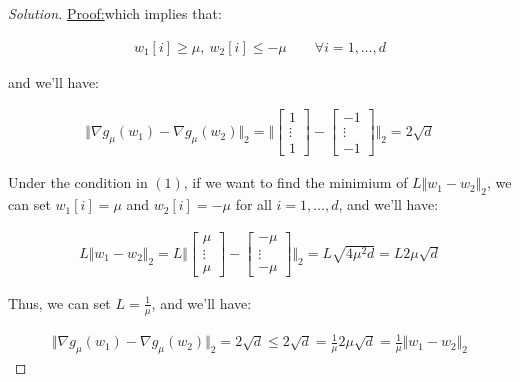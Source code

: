 \documentclass{article}
\newenvironment{solution}
  {\renewcommand\qedsymbol{$\blacksquare$}\begin{proof}[Solution]}
  {\end{proof}}
\newenvironment{claimproof}[1]{\par\noindent\underline{Proof:}\space#1}{}
\begin{document}
\begin{solution}
\begin{claimproof}
        which implies that:

        \begin{align*}
            w_1[i] \geq \mu, \ w_2[i] \leq - \mu \qquad \forall i = 1, \dots, d \tag{1}
        \end{align*}

        and we'll have:

        \begin{align*}
            \Vert \nabla g_\mu(w_1) - \nabla g_\mu(w_2) \Vert_2 
            = \Vert \begin{bmatrix}
                1 \\
                \vdots \\
                1
            \end{bmatrix} - \begin{bmatrix}
                -1 \\
                \vdots \\
                -1
            \end{bmatrix} \Vert_2
            = 2 \sqrt{d}
        \end{align*}

        Under the condition in $(1)$, if we want to find the minimium of $L \Vert w_1 - w_2 \Vert_2$, 
        we can set $w_1[i] = \mu$ and $w_2[i] = - \mu$ for all $i = 1, \dots, d$, 
        and we'll have:

        \begin{align*}
            L \Vert w_1 - w_2 \Vert_2 = L \Vert \begin{bmatrix}
                \mu \\
                \vdots \\
                \mu
            \end{bmatrix} - \begin{bmatrix}
                - \mu \\
                \vdots \\
                - \mu
            \end{bmatrix} \Vert_2 = L \sqrt{4 \mu^2 d} = L 2 \mu \sqrt{d}
        \end{align*}

        Thus, we can set $L = \frac{1}{\mu}$, and we'll have:

        \begin{align*}
            \Vert \nabla g_\mu(w_1) - \nabla g_\mu(w_2) \Vert_2 = 2 \sqrt{d} \leq 2 \sqrt{d} = \frac{1}{\mu} 2 \mu \sqrt{d} = \frac{1}{\mu} \Vert w_1 - w_2 \Vert_2 
        \end{align*}
    \end{claimproof}
\end{solution}
\end{document}
